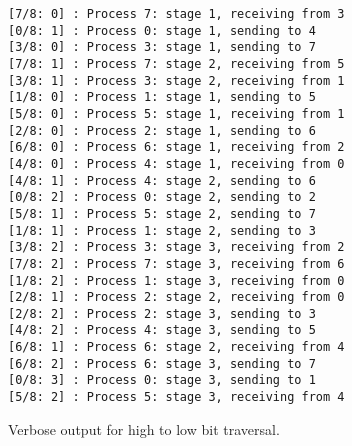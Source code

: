 \documentclass[11pt,a4paper,oneside]{report}
\begin{document}
\begin{figure}[htpb]
  \texttt{[7/8:   0] : Process 7:  stage 1, receiving from 3\\}
  \texttt{[0/8:   1] : Process 0:  stage 1, sending to 4\\}
  \texttt{[3/8:   0] : Process 3:  stage 1, sending to 7\\}
  \texttt{[7/8:   1] : Process 7:  stage 2, receiving from 5\\}
  \texttt{[3/8:   1] : Process 3:  stage 2, receiving from 1\\}
  \texttt{[1/8:   0] : Process 1:  stage 1, sending to 5\\}
  \texttt{[5/8:   0] : Process 5:  stage 1, receiving from 1\\}
  \texttt{[2/8:   0] : Process 2:  stage 1, sending to 6\\}
  \texttt{[6/8:   0] : Process 6:  stage 1, receiving from 2\\}
  \texttt{[4/8:   0] : Process 4:  stage 1, receiving from 0\\}
  \texttt{[4/8:   1] : Process 4:  stage 2, sending to 6\\}
  \texttt{[0/8:   2] : Process 0:  stage 2, sending to 2\\}
  \texttt{[5/8:   1] : Process 5:  stage 2, sending to 7\\}
  \texttt{[1/8:   1] : Process 1:  stage 2, sending to 3\\}
  \texttt{[3/8:   2] : Process 3:  stage 3, receiving from 2\\}
  \texttt{[7/8:   2] : Process 7:  stage 3, receiving from 6\\}
  \texttt{[1/8:   2] : Process 1:  stage 3, receiving from 0\\}
  \texttt{[2/8:   1] : Process 2:  stage 2, receiving from 0\\}
  \texttt{[2/8:   2] : Process 2:  stage 3, sending to 3\\}
  \texttt{[4/8:   2] : Process 4:  stage 3, sending to 5\\}
  \texttt{[6/8:   1] : Process 6:  stage 2, receiving from 4\\}
  \texttt{[6/8:   2] : Process 6:  stage 3, sending to 7\\}
  \texttt{[0/8:   3] : Process 0:  stage 3, sending to 1\\}
  \texttt{[5/8:   2] : Process 5:  stage 3, receiving from 4\\}
  \caption{Verbose output for high to low bit traversal.}
  \label{fig:hightolowout}
\end{figure}
\end{document}
